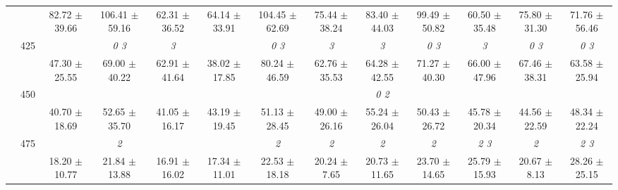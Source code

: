 \begin{table}[h]
{\begin{tabular}{
        ccccccccccccc}
 & & 82.72 $\pm$ 39.66& 106.41 $\pm$ 59.16& 62.31 $\pm$ 36.52& 64.14 $\pm$ 33.91& 104.45 $\pm$ 62.69& 75.44 $\pm$ 38.24& 83.40 $\pm$ 44.03& 99.49 $\pm$ 50.82& 60.50 $\pm$ 35.48& 75.80 $\pm$ 31.30& 71.76 $\pm$ 56.46 \\ 
 & \multirow{2}{*}{425}& \cellcolor[HTML]{EFEFEF} & \cellcolor[HTML]{EFEFEF} \textit{ 0 3 }& \cellcolor[HTML]{EFEFEF} \textit{ 3 }& \cellcolor[HTML]{EFEFEF} & \cellcolor[HTML]{EFEFEF} \textit{ 0 3 }& \cellcolor[HTML]{EFEFEF} \textit{ 3 }& \cellcolor[HTML]{EFEFEF} \textit{ 3 }& \cellcolor[HTML]{EFEFEF} \textit{ 0 3 }& \cellcolor[HTML]{EFEFEF} \textit{ 3 }& \cellcolor[HTML]{EFEFEF} \textit{ 0 3 }& \cellcolor[HTML]{EFEFEF} \textit{ 0 3 } \\ 
 & & \cellcolor[HTML]{EFEFEF} 47.30 $\pm$ 25.55& \cellcolor[HTML]{EFEFEF} 69.00 $\pm$ 40.22& \cellcolor[HTML]{EFEFEF} 62.91 $\pm$ 41.64& \cellcolor[HTML]{EFEFEF} 38.02 $\pm$ 17.85& \cellcolor[HTML]{EFEFEF} 80.24 $\pm$ 46.59& \cellcolor[HTML]{EFEFEF} 62.76 $\pm$ 35.53& \cellcolor[HTML]{EFEFEF} 64.28 $\pm$ 42.55& \cellcolor[HTML]{EFEFEF} 71.27 $\pm$ 40.30& \cellcolor[HTML]{EFEFEF} 66.00 $\pm$ 47.96& \cellcolor[HTML]{EFEFEF} 67.46 $\pm$ 38.31& \cellcolor[HTML]{EFEFEF} 63.58 $\pm$ 25.94 \\ 
 & \multirow{2}{*}{450}& & & & & & & \textit{ 0 2 }& & & &  \\ 
 & & 40.70 $\pm$ 18.69& 52.65 $\pm$ 35.70& 41.05 $\pm$ 16.17& 43.19 $\pm$ 19.45& 51.13 $\pm$ 28.45& 49.00 $\pm$ 26.16& 55.24 $\pm$ 26.04& 50.43 $\pm$ 26.72& 45.78 $\pm$ 20.34& 44.56 $\pm$ 22.59& 48.34 $\pm$ 22.24 \\ 
 & \multirow{2}{*}{475}& \cellcolor[HTML]{EFEFEF} & \cellcolor[HTML]{EFEFEF} \textit{ 2 }& \cellcolor[HTML]{EFEFEF} & \cellcolor[HTML]{EFEFEF} & \cellcolor[HTML]{EFEFEF} \textit{ 2 }& \cellcolor[HTML]{EFEFEF} \textit{ 2 }& \cellcolor[HTML]{EFEFEF} \textit{ 2 }& \cellcolor[HTML]{EFEFEF} \textit{ 2 }& \cellcolor[HTML]{EFEFEF} \textit{ 2 3 }& \cellcolor[HTML]{EFEFEF} \textit{ 2 }& \cellcolor[HTML]{EFEFEF} \textit{ 2 3 } \\ 
 & & \cellcolor[HTML]{EFEFEF} 18.20 $\pm$ 10.77& \cellcolor[HTML]{EFEFEF} 21.84 $\pm$ 13.88& \cellcolor[HTML]{EFEFEF} 16.91 $\pm$ 16.02& \cellcolor[HTML]{EFEFEF} 17.34 $\pm$ 11.01& \cellcolor[HTML]{EFEFEF} 22.53 $\pm$ 18.18& \cellcolor[HTML]{EFEFEF} 20.24 $\pm$ 7.65& \cellcolor[HTML]{EFEFEF} 20.73 $\pm$ 11.65& \cellcolor[HTML]{EFEFEF} 23.70 $\pm$ 14.65& \cellcolor[HTML]{EFEFEF} 25.79 $\pm$ 15.93& \cellcolor[HTML]{EFEFEF} 20.67 $\pm$ 8.13& \cellcolor[HTML]{EFEFEF} 28.26 $\pm$ 25.15 \\ 

\end{tabular}}
\end{table}
